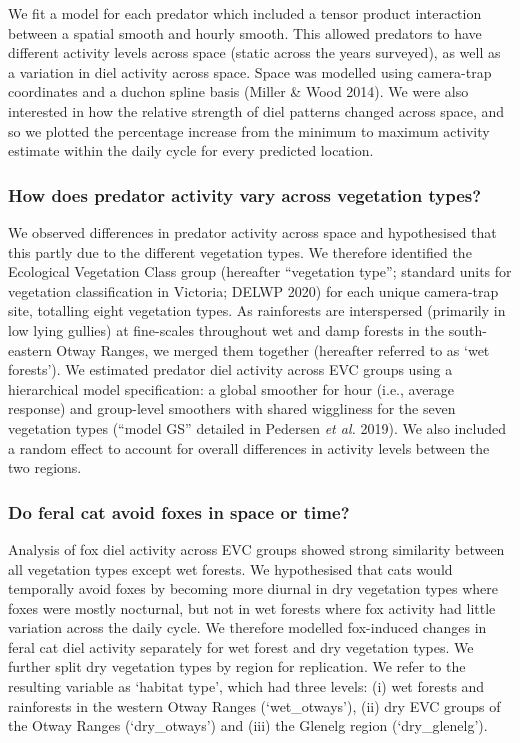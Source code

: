 \documentclass[11pt,a4paper,titlepage,twoside,openright]{style/unimelbthesis}
\begin{document}
\begin{mainmatter}
We fit a model for each predator which included a tensor product interaction between a spatial smooth and hourly smooth. This allowed predators to have different activity levels across space (static across the years surveyed), as well as a variation in diel activity across space. Space was modelled using camera-trap coordinates and a duchon spline basis (Miller \& Wood 2014). We were also interested in how the relative strength of diel patterns changed across space, and so we plotted the percentage increase from the minimum to maximum activity estimate within the daily cycle for every predicted location.

\hypertarget{how-does-predator-activity-vary-across-vegetation-types}{%
\subsubsection{How does predator activity vary across vegetation types?}\label{how-does-predator-activity-vary-across-vegetation-types}}

We observed differences in predator activity across space and hypothesised that this partly due to the different vegetation types. We therefore identified the Ecological Vegetation Class group (hereafter ``vegetation type''; standard units for vegetation classification in Victoria; DELWP 2020) for each unique camera-trap site, totalling eight vegetation types. As rainforests are interspersed (primarily in low lying gullies) at fine-scales throughout wet and damp forests in the south-eastern Otway Ranges, we merged them together (hereafter referred to as `wet forests'). We estimated predator diel activity across EVC groups using a hierarchical model specification: a global smoother for hour (i.e., average response) and group-level smoothers with shared wiggliness for the seven vegetation types (``model GS'' detailed in Pedersen \emph{et al.} 2019). We also included a random effect to account for overall differences in activity levels between the two regions.

\hypertarget{do-feral-cat-avoid-foxes-in-space-or-time}{%
\subsubsection{Do feral cat avoid foxes in space or time?}\label{do-feral-cat-avoid-foxes-in-space-or-time}}

Analysis of fox diel activity across EVC groups showed strong similarity between all vegetation types except wet forests. We hypothesised that cats would temporally avoid foxes by becoming more diurnal in dry vegetation types where foxes were mostly nocturnal, but not in wet forests where fox activity had little variation across the daily cycle. We therefore modelled fox-induced changes in feral cat diel activity separately for wet forest and dry vegetation types. We further split dry vegetation types by region for replication. We refer to the resulting variable as `habitat type', which had three levels: (i) wet forests and rainforests in the western Otway Ranges (`wet\_otways'), (ii) dry EVC groups of the Otway Ranges (`dry\_otways') and (iii) the Glenelg region (`dry\_glenelg').


\end{mainmatter}
\end{document}
